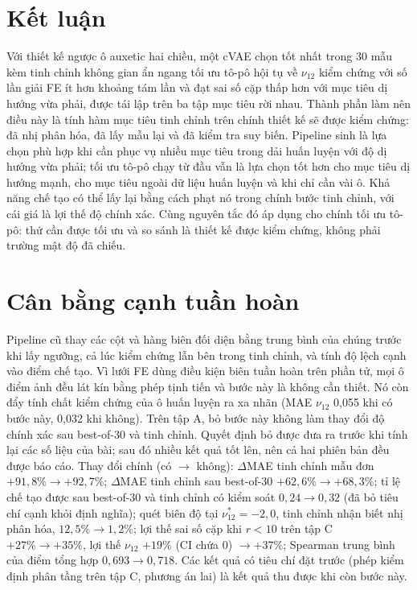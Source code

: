 \documentclass[a4paper,11pt]{article}
\newcommand{\nuot}{\nu_{12}}
\begin{document}
\section{Kết luận}
Với thiết kế ngược ô auxetic hai chiều, một cVAE chọn tốt nhất trong 30 mẫu
kèm tinh chỉnh không gian ẩn ngang tối ưu tô-pô hội tụ về $\nuot$ kiểm chứng
với số lần giải FE ít hơn khoảng tám lần và đạt sai số cặp thấp hơn với mục
tiêu dị hướng vừa phải, được tái lập trên ba tập mục tiêu rời nhau. Thành
phần làm nên điều này là tính hàm mục tiêu tinh chỉnh trên chính thiết kế sẽ
được kiểm chứng: đã nhị phân hóa, đã lấy mẫu lại và đã kiểm tra suy biến.
Pipeline sinh là lựa chọn phù hợp khi cần phục vụ nhiều mục tiêu trong dải
huấn luyện với độ dị hướng vừa phải; tối ưu tô-pô chạy từ đầu vẫn là lựa chọn
tốt hơn cho mục tiêu dị hướng mạnh, cho mục tiêu ngoài dữ liệu huấn luyện và
khi chỉ cần vài ô. Khả năng chế tạo có thể lấy lại bằng cách phạt nó trong
chính bước tinh chỉnh, với cái giá là lợi thế độ chính xác. Cùng nguyên tắc đó áp dụng cho chính
tối ưu tô-pô: thứ cần được tối ưu và so sánh là thiết kế được kiểm chứng,
không phải trường mật độ đã chiếu.

\appendix
\section{Cân bằng cạnh tuần hoàn}
\label{app:fp}
Pipeline cũ thay các cột và hàng biên đối diện bằng trung bình của chúng
trước khi lấy ngưỡng, cả lúc kiểm chứng lẫn bên trong tinh chỉnh, và tính độ
lệch cạnh vào điểm chế tạo. Vì lưới FE dùng điều kiện biên tuần hoàn trên
phần tử, mọi ô điểm ảnh đều lát kín bằng phép tịnh tiến và bước này là không
cần thiết. Nó còn đẩy tính chất kiểm chứng của ô huấn luyện ra xa nhãn (MAE
$\nuot$ 0,055 khi có bước này, 0,032 khi không). Trên tập A, bỏ bước này
không làm thay đổi độ chính xác sau best-of-30 và tinh chỉnh. Quyết định bỏ
được đưa ra trước khi tính lại các số liệu của bài; sau đó nhiều kết quả tốt
lên, nên cả hai phiên bản đều được báo cáo. Thay đổi chính (có $\to$ không):
$\Delta$MAE tinh chỉnh mẫu đơn $+91,8\%\to+92,7\%$; $\Delta$MAE tinh chỉnh
sau best-of-30 $+62,6\%\to+68,3\%$; tỉ lệ chế tạo được sau best-of-30 và tinh
chỉnh có kiểm soát $0,24\to0,32$ (đã bỏ tiêu chí cạnh khỏi định nghĩa); quét
biên độ tại $\nuot^{*}=-2,0$, tinh chỉnh nhận biết nhị phân hóa,
$12,5\%\to1,2\%$; lợi thế sai số cặp khi $r<10$ trên tập C $+27\%\to+35\%$,
lợi thế $\nuot$ $+19\%$ (CI chứa 0) $\to+37\%$; Spearman trung bình của điểm
tổng hợp $0,693\to0,718$. Các kết quả có tiêu chí đặt trước (phép kiểm định
phân tầng trên tập C, phương án lai) là kết quả thu được khi còn bước này.
\end{document}
